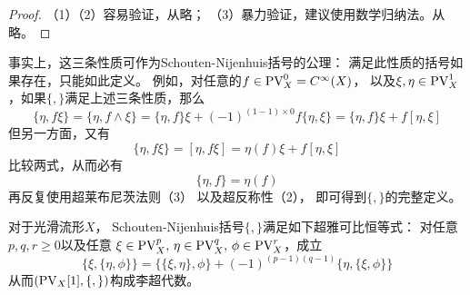 






\begin{proof}
（1）（2）容易验证，从略；
（3）暴力验证，建议使用数学归纳法。从略。
\end{proof}

事实上，这三条性质可作为Schouten-Nijenhuis括号的公理：
满足此性质的括号如果存在，只能如此定义。
例如，对任意的$f\in\operatorname{PV}^0_X=C^{\infty}(X)$，
以及$\xi,\eta\in\operatorname{PV}^1_X$，如果$\{,\}$满足上述三条性质，那么
$$\{\eta,f\xi\}=\{\eta,f\wedge\xi\}=
\{\eta,f\}\xi+(-1)^{(1-1)\times 0}f\{\eta,\xi\}
=\{\eta,f\}\xi+f[\eta,\xi]$$
但另一方面，又有
$$\{\eta,f\xi\}=[\eta,f\xi]=\eta(f)\xi+f[\eta,\xi]$$
比较两式，从而必有
$$\{\eta,f\}=\eta(f)$$
再反复使用超莱布尼茨法则（3）
以及超反称性（2），
即可得到$\{,\}$的完整定义。

\begin{prop}对于光滑流形$X$，
Schouten-Nijenhuis括号$\{,\}$满足如下超雅可比恒等式：
对任意$p,q,r\geq0$以及任意
$\xi\in\operatorname{PV}^p_X,\,\eta\in\operatorname{PV}_X^q,\,\phi\in\operatorname{PV}_X^r$，成立
$$
  \{\xi,\{\eta,\phi\}\}=
  \{\{\xi,\eta\},\phi\}+(-1)^{(p-1)(q-1)}
  \{\eta,\{\xi,\phi\}\}
$$
从而$(\operatorname{PV}_X[1],\{,\})$构成李超代数。
\end{prop}

